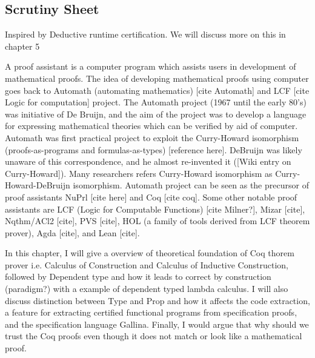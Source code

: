 	       
    
   \subsection{Scrutiny Sheet}
       Inspired by Deductive runtime certification. 
    We will discuss more on this in chapter 5
   


A proof assistant is a computer program which assists users in development of mathematical proofs. The idea of 
developing mathematical proofs using computer goes back to Automath (automating mathematics)
[cite Automath] and LCF [cite Logic for computation] project. The 
Automath project (1967 until the early 80's)  was initiative of De Bruijn, and the aim of the project was to develop
a language for expressing mathematical theories which can be verified by aid of computer.  Automath was first 
practical project to exploit the Curry-Howard isomorphism (proofs-as-programs and formulas-as-types)
 [reference here]. DeBruijn  was likely unaware of this correspondence, and he almost re-invented it 
 ([Wiki entry on Curry-Howard]). Many researchers refers Curry-Howard isomorphism as 
 Curry-Howard-DeBruijn isomorphism. Automath project can be seen as the precursor of
 proof assistants NuPrl [cite here] and Coq [cite coq].   Some other notable  proof assistants are 
 LCF (Logic for Computable Functions)  [cite Milner?], Mizar [cite], Nqthm/ACl2 [cite], PVS [cite], 
 HOL (a family of tools derived from LCF theorem prover), Agda [cite], and Lean [cite].


In this chapter, I will give a overview of theoretical foundation of 
Coq thorem prover i.e. Calculus of Construction and  
Calculus of Inductive Construction, followed by Dependent type 
and how it leads to 
correct by construction (paradigm?) with a example of dependent 
typed lambda calculus. I will also discuss distinction between Type and Prop 
and how it affects the code extraction, a feature for extracting 
certified functional programs from specification proofs, and the 
specification language Gallina. Finally, I would 
argue that why should we trust the Coq proofs even though it does not 
match or look like a mathematical proof.



 
